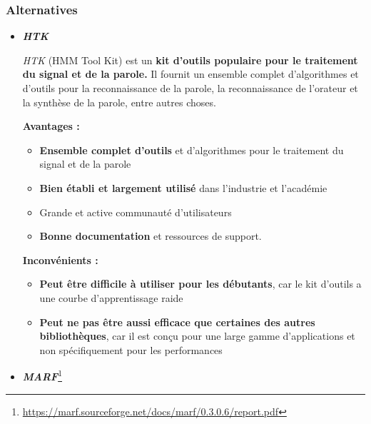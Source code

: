\subsubsection*{Alternatives}

\begin{itemize}
      \item \large\textbf{\textit{HTK}} \normalsize

            \textit{HTK} (HMM Tool Kit) est un \textbf{kit d'outils populaire pour le traitement du signal et de la parole.} Il fournit un ensemble complet d'algorithmes et d'outils
            pour la reconnaissance de la parole, la reconnaissance de l'orateur et la synthèse de la parole, entre autres choses.

            \textbf{Avantages :}
            \begin{itemize}
                  \item \textbf{Ensemble complet d'outils }et d'algorithmes pour le traitement du signal et de la parole
                  \item \textbf{Bien établi et largement utilisé} dans l'industrie et l'académie
                  \item Grande et active communauté d'utilisateurs
                  \item \textbf{Bonne documentation} et ressources de support.
            \end{itemize}


            \textbf{Inconvénients :}
            \begin{itemize}
                  \item \textbf{Peut être difficile à utiliser pour les débutants}, car le kit d'outils a une courbe d'apprentissage raide
                  \item \textbf{Peut ne pas être aussi efficace que certaines des autres bibliothèques}, car il est conçu pour une large gamme
                        d'applications et non spécifiquement pour les performances
            \end{itemize}

      \item\large\textbf{\textit{MARF}}\normalsize\footnote{\url{https://marf.sourceforge.net/docs/marf/0.3.0.6/report.pdf}}



\end{itemize}
